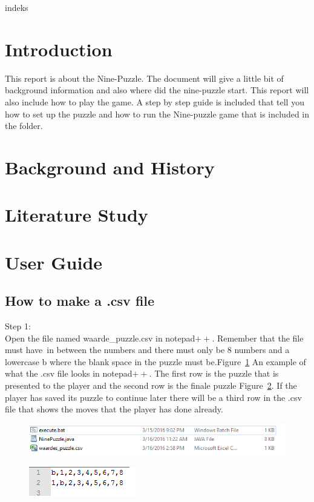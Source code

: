 \documentclass[10pt]{article}
\begin{document}

\newpage
indeks
\newpage
\section{Introduction}
This report is about the Nine-Puzzle.  The document will give a little bit of background information and also where did the nine-puzzle start.  This report will also include how to play the game. A step by step guide is included that tell you how to set up the puzzle and how to run the Nine-puzzle game that is included in the folder.
\section{Background and History}


\section{Literature Study}

\section{User Guide}
\subsection{How to make a .csv file}
Step 1:
\\Open the file named waarde\_puzzle.csv in notepad$++$.
Remember that the file must have \,in between the numbers and there must only be 8 numbers and a lowercase b where the blank space in the puzzle must be.Figure~\ref{csv}
An example of what the .csv file looks in notepad$++$. The first row is the puzzle that is presented to the player and the second row is the finale puzzle Figure~\ref{waardes}.  If the player has saved its puzzle to continue later there will be a third row in the .csv file that shows the moves that the player has done already.
\begin{figure}
\centering
\includegraphics[scale=0.7]{./Prente/csv.png}
\caption{}
\label{csv}
\end{figure}
\begin{figure}
\centering
\includegraphics[scale=1]{./Prente/waardes.png}
\caption{}
\label{waardes}
\end{figure}
\end{document}
